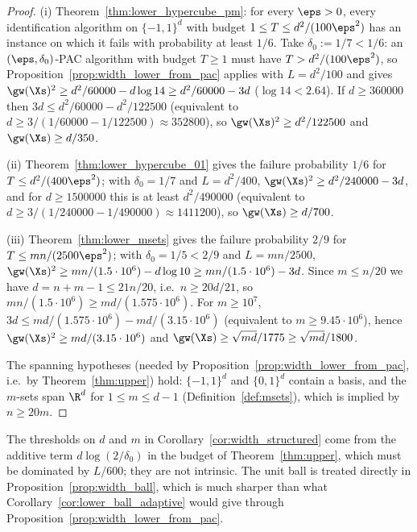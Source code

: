 \begin{proof}
(i) Theorem~\ref{thm:lower_hypercube_pm}: for every $\eps > 0$, every identification
algorithm on $\{-1,1\}^d$ with budget $1 \le T \le d^2/(100\eps^2)$ has an instance on which it
fails with probability at least $1/6$. Take $\delta_0 := 1/7 < 1/6$: an
$(\eps,\delta_0)$-PAC algorithm with budget $T \ge 1$ must have $T > d^2/(100\eps^2)$, so
Proposition~\ref{prop:width_lower_from_pac} applies with $L = d^2/100$ and gives
$\gw(\Xs)^2 \ge d^2/60000 - d\log 14 \ge d^2/60000 - 3d$ ($\log 14 < 2.64$). If
$d \ge 360000$ then $3d \le d^2/60000 - d^2/122500$ (equivalent to
$d \ge 3/(1/60000 - 1/122500) \approx 352800$), so $\gw(\Xs)^2 \ge d^2/122500$ and
$\gw(\Xs) \ge d/350$.

(ii) Theorem~\ref{thm:lower_hypercube_01} gives the failure probability $1/6$ for
$T \le d^2/(400\eps^2)$; with $\delta_0 = 1/7$ and $L = d^2/400$,
$\gw(\Xs)^2 \ge d^2/240000 - 3d$, and for $d \ge 1500000$ this is at least
$d^2/490000$ (equivalent to $d \ge 3/(1/240000 - 1/490000) \approx 1411200$), so
$\gw(\Xs) \ge d/700$.

(iii) Theorem~\ref{thm:lower_msets} gives the failure probability $2/9$ for
$T \le mn/(2500\eps^2)$; with $\delta_0 = 1/5 < 2/9$ and $L = mn/2500$,
$\gw(\Xs)^2 \ge mn/(1.5\cdot10^6) - d\log 10 \ge mn/(1.5\cdot 10^6) - 3d$. Since
$m \le n/20$ we have $d = n + m - 1 \le 21n/20$, i.e.\ $n \ge 20d/21$, so
$mn/(1.5\cdot10^6) \ge md/(1.575\cdot10^6)$. For $m \ge 10^7$,
$3d \le md/(1.575\cdot10^6) - md/(3.15\cdot 10^6)$ (equivalent to $m \ge 9.45\cdot10^6$),
hence $\gw(\Xs)^2 \ge md/(3.15\cdot10^6)$ and $\gw(\Xs) \ge \sqrt{md}/1775 \ge \sqrt{md}/1800$.

The spanning hypotheses (needed by Proposition~\ref{prop:width_lower_from_pac}, i.e.\ by
Theorem~\ref{thm:upper}) hold: $\{-1,1\}^d$ and $\{0,1\}^d$ contain a basis, and the
$m$-sets span $\R^d$ for $1 \le m \le d-1$ (Definition~\ref{def:msets}), which is implied by
$n \ge 20m$.
\end{proof}

\begin{remark}
The thresholds on $d$ and $m$ in Corollary~\ref{cor:width_structured} come from the additive
term $d\log(2/\delta_0)$ in the budget of Theorem~\ref{thm:upper}, which must be dominated
by $L/600$; they are not intrinsic. The unit ball is treated directly in
Proposition~\ref{prop:width_ball}, which is much sharper than what
Corollary~\ref{cor:lower_ball_adaptive} would give through
Proposition~\ref{prop:width_lower_from_pac}.
\end{remark}

